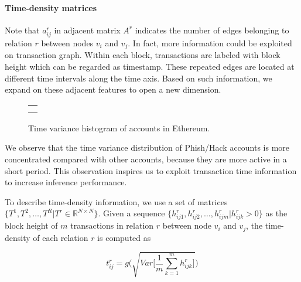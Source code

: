 \paragraph{Time-density matrices}
Note that $a^r_{ij}$ in adjacent matrix $A^r$ indicates the number of edges belonging to relation $r$ between nodes $v_i$ and $v_j$.
In fact, more information could be exploited on transaction graph. Within each block, transactions are labeled with block height which can be regarded as timestamp. These repeated edges are located at different time intervals along the time axis. Based on such information, we expand on these adjacent features to open a new dimension.


\begin{figure}[htbp]
\centering
\begin{tabular}{c}
	\subfigure[Time variance histogram of all nodes.]{
		\label{fig:high_order}
    
	}\\
	\subfigure[Time variance histogram of Phish/Hack nodes.]{
		\label{fig:asymmetric}
    
	}
\end{tabular}
\caption{Time variance histogram of accounts in Ethereum.}
\label{fig:time_std}
\end{figure}

We observe that the time variance distribution of Phish/Hack accounts is more concentrated compared with other accounts, because they are more active in a short period. This observation inspires us to exploit transaction time information to increase inference performance.

To describe time-density information, we use a set of matrices $\{T^1,T^2,\dots,T^R|T^r\in \mathbb{R}^{N \times N}\}$. Given a sequence $\{h_{ij1}^r,h_{ij2}^r,\dots,h_{ijm}^r | h_{ijk}^r>0\}$ as the block height of $m$ transactions in relation $r$ between node $v_i$ and $v_j$, the time-density of each relation $r$ is computed as%

\begin{equation}
t_{ij}^r=g\Bigg(\sqrt{Var\Big[\frac{1}{m}\sum_{k=1}^m h_{ijk}^r\Big]}\Bigg)
\label{eq:time}
\end{equation}

